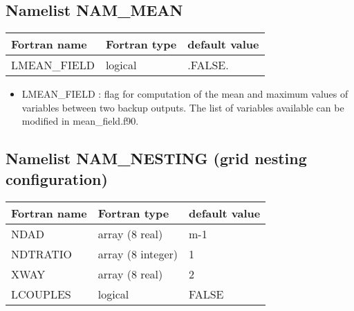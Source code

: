 \subsection{Namelist NAM\_MEAN}
\begin{center}
\begin{tabular} {|l|l|l|}
\hline
Fortran name & Fortran type & default value \\
\hline
LMEAN\_FIELD  &  logical &  .FALSE. \\
\hline
\end{tabular}
\end{center}
\begin{itemize}
 \item LMEAN\_FIELD : flag for computation of the mean and maximum values of variables between two backup outputs. The list of variables available can be modified in mean\_field.f90.
\end{itemize}

\subsection{Namelist NAM\_NESTING (grid nesting configuration)}

\begin{center}
\begin{tabular} {|l|l|l|}
\hline
Fortran name & Fortran type & default value \\
\hline
NDAD  &  array (8 real) &  m-1   \\
NDTRATIO & array (8 integer) & 1 \\
XWAY & array (8 real) & 2 \\
LCOUPLES & logical & FALSE \\
\hline
\end{tabular}
\end{center}

